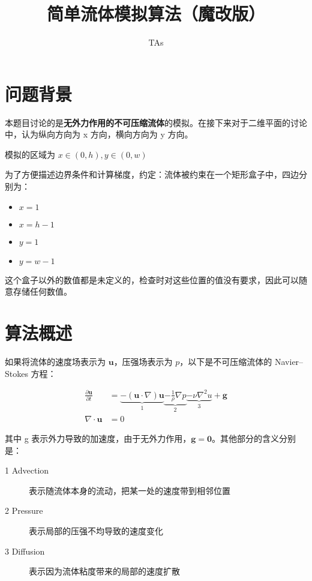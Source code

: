 \documentclass{ctexart}
\title{简单流体模拟算法（魔改版）}
\author{TAs}
\begin{document}
\maketitle

\section{问题背景}

\label{sec:bg}

本题目讨论的是\textbf{无外力作用的不可压缩流体}的模拟。在接下来对于二维平面的讨论中，认为纵向方向为 x 方向，横向方向为 y 方向。

模拟的区域为 $x \in (0, h), y \in (0, w)$

为了方便描述边界条件和计算梯度，约定：流体被约束在一个矩形盒子中，四边分别为：

\begin{itemize}
\item $x = 1$
\item $x = h - 1$

\item $y = 1$
\item $y = w - 1$
\end{itemize}

这个盒子以外的数值都是未定义的，检查时对这些位置的值没有要求，因此可以随意存储任何数值。

\section{算法概述}

如果将流体的速度场表示为 $\mathbf{u}$，压强场表示为 $p$，以下是不可压缩流体的 Navier–Stokes 方程：

\begin{equation}
\begin{split}
\label{eq:base}
\frac{\partial \mathbf{u}}{\partial t} & = \underbrace{- (\mathbf{u} \cdot \nabla) \mathbf{u}}_1 \underbrace{- \frac{1}{\rho} \nabla p}_2 \underbrace{- \nu \nabla^2 u}_3 + \mathbf{g} \\
\nabla \cdot \mathbf{u} & = 0
\end{split}
\end{equation}

其中 g 表示外力导致的加速度，由于无外力作用，$\mathbf{g} = \mathbf{0}$。其他部分的含义分别是：

\begin{description}
  \item[1 Advection] 表示随流体本身的流动，把某一处的速度带到相邻位置
  \item[2 Pressure] 表示局部的压强不均导致的速度变化
  \item[3 Diffusion] 表示因为流体粘度带来的局部的速度扩散
\end{description}
\end{document}
